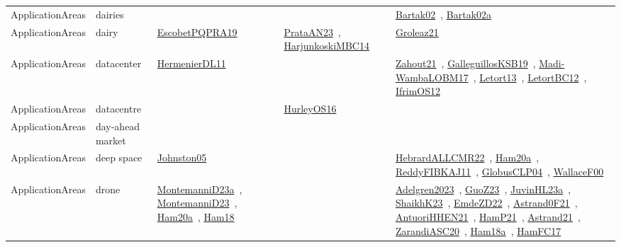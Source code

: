 {\begin{longtable}{lp{3cm}>{\raggedright\arraybackslash}p{6cm}>{\raggedright\arraybackslash}p{6cm}>{\raggedright\arraybackslash}p{8cm}}
\index{dairies}\index{ApplicationAreas!dairies}ApplicationAreas & dairies &  &  & \href{../works/Bartak02.pdf}{Bartak02}~\cite{Bartak02}, \href{../works/Bartak02a.pdf}{Bartak02a}~\cite{Bartak02a}\\
\index{dairy}\index{ApplicationAreas!dairy}ApplicationAreas & dairy & \href{../works/EscobetPQPRA19.pdf}{EscobetPQPRA19}~\cite{EscobetPQPRA19} & \href{../works/PrataAN23.pdf}{PrataAN23}~\cite{PrataAN23}, \href{../works/HarjunkoskiMBC14.pdf}{HarjunkoskiMBC14}~\cite{HarjunkoskiMBC14} & \href{../works/Groleaz21.pdf}{Groleaz21}~\cite{Groleaz21}\\
\index{datacenter}\index{ApplicationAreas!datacenter}ApplicationAreas & datacenter & \href{../works/HermenierDL11.pdf}{HermenierDL11}~\cite{HermenierDL11} &  & \href{../works/Zahout21.pdf}{Zahout21}~\cite{Zahout21}, \href{../works/GalleguillosKSB19.pdf}{GalleguillosKSB19}~\cite{GalleguillosKSB19}, \href{../works/Madi-WambaLOBM17.pdf}{Madi-WambaLOBM17}~\cite{Madi-WambaLOBM17}, \href{../works/Letort13.pdf}{Letort13}~\cite{Letort13}, \href{../works/LetortBC12.pdf}{LetortBC12}~\cite{LetortBC12}, \href{../works/IfrimOS12.pdf}{IfrimOS12}~\cite{IfrimOS12}\\
\index{datacentre}\index{ApplicationAreas!datacentre}ApplicationAreas & datacentre &  & \href{../works/HurleyOS16.pdf}{HurleyOS16}~\cite{HurleyOS16} & \\
\index{day-ahead market}\index{ApplicationAreas!day-ahead market}ApplicationAreas & day-ahead market &  &  & \\
\index{deep space}\index{ApplicationAreas!deep space}ApplicationAreas & deep space & \href{../works/Johnston05.pdf}{Johnston05}~\cite{Johnston05} &  & \href{../works/HebrardALLCMR22.pdf}{HebrardALLCMR22}~\cite{HebrardALLCMR22}, \href{../works/Ham20a.pdf}{Ham20a}~\cite{Ham20a}, \href{../works/ReddyFIBKAJ11.pdf}{ReddyFIBKAJ11}~\cite{ReddyFIBKAJ11}, \href{../works/GlobusCLP04.pdf}{GlobusCLP04}~\cite{GlobusCLP04}, \href{../works/WallaceF00.pdf}{WallaceF00}~\cite{WallaceF00}\\
\index{drone}\index{ApplicationAreas!drone}ApplicationAreas & drone & \href{../works/MontemanniD23a.pdf}{MontemanniD23a}~\cite{MontemanniD23a}, \href{../works/MontemanniD23.pdf}{MontemanniD23}~\cite{MontemanniD23}, \href{../works/Ham20a.pdf}{Ham20a}~\cite{Ham20a}, \href{../works/Ham18.pdf}{Ham18}~\cite{Ham18} &  & \href{../works/Adelgren2023.pdf}{Adelgren2023}~\cite{Adelgren2023}, \href{../works/GuoZ23.pdf}{GuoZ23}~\cite{GuoZ23}, \href{../works/JuvinHL23a.pdf}{JuvinHL23a}~\cite{JuvinHL23a}, \href{../works/ShaikhK23.pdf}{ShaikhK23}~\cite{ShaikhK23}, \href{../works/EmdeZD22.pdf}{EmdeZD22}~\cite{EmdeZD22}, \href{../works/Astrand0F21.pdf}{Astrand0F21}~\cite{Astrand0F21}, \href{../works/AntuoriHHEN21.pdf}{AntuoriHHEN21}~\cite{AntuoriHHEN21}, \href{../works/HamP21.pdf}{HamP21}~\cite{HamP21}, \href{../works/Astrand21.pdf}{Astrand21}~\cite{Astrand21}, \href{../works/ZarandiASC20.pdf}{ZarandiASC20}~\cite{ZarandiASC20}, \href{../works/Ham18a.pdf}{Ham18a}~\cite{Ham18a}, \href{../works/HamFC17.pdf}{HamFC17}~\cite{HamFC17}\\

\end{longtable}}
